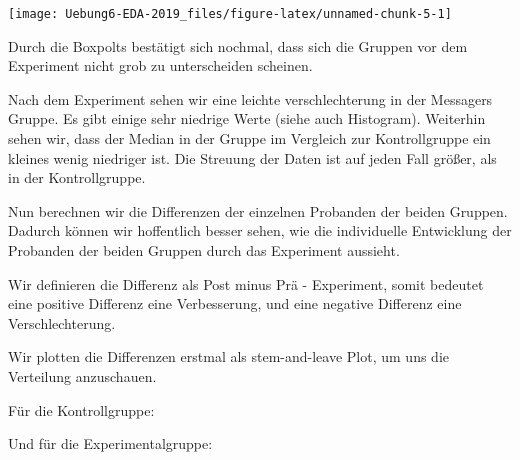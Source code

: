 \documentclass[]{article}
\newenvironment{Shaded}{\begin{snugshade}}{\end{snugshade}}
\newcommand{\CommentTok}[1]{\textcolor[rgb]{0.56,0.35,0.01}{\textit{#1}}}
\newcommand{\DecValTok}[1]{\textcolor[rgb]{0.00,0.00,0.81}{#1}}
\newcommand{\KeywordTok}[1]{\textcolor[rgb]{0.13,0.29,0.53}{\textbf{#1}}}
\newcommand{\NormalTok}[1]{#1}
\newcommand{\OperatorTok}[1]{\textcolor[rgb]{0.81,0.36,0.00}{\textbf{#1}}}
\newcommand{\StringTok}[1]{\textcolor[rgb]{0.31,0.60,0.02}{#1}}
\begin{document}
\texttt{[image: Uebung6-EDA-2019\_files/figure-latex/unnamed-chunk-5-1]}

Durch die Boxpolts bestätigt sich nochmal, dass sich die Gruppen vor dem
Experiment nicht grob zu unterscheiden scheinen.

Nach dem Experiment sehen wir eine leichte verschlechterung in der
Messagers Gruppe. Es gibt einige sehr niedrige Werte (siehe auch
Histogram). Weiterhin sehen wir, dass der Median in der Gruppe im
Vergleich zur Kontrollgruppe ein kleines wenig niedriger ist. Die
Streuung der Daten ist auf jeden Fall größer, als in der Kontrollgruppe.

Nun berechnen wir die Differenzen der einzelnen Probanden der beiden
Gruppen. Dadurch können wir hoffentlich besser sehen, wie die
individuelle Entwicklung der Probanden der beiden Gruppen durch das
Experiment aussieht.

Wir definieren die Differenz als Post minus Prä - Experiment, somit
bedeutet eine positive Differenz eine Verbesserung, und eine negative
Differenz eine Verschlechterung.

Wir plotten die Differenzen erstmal als stem-and-leave Plot, um uns die
Verteilung anzuschauen.

Für die Kontrollgruppe:

\begin{Shaded}
\end{Shaded}

Und für die Experimentalgruppe:

\begin{Shaded}
\end{Shaded}
\end{document}
